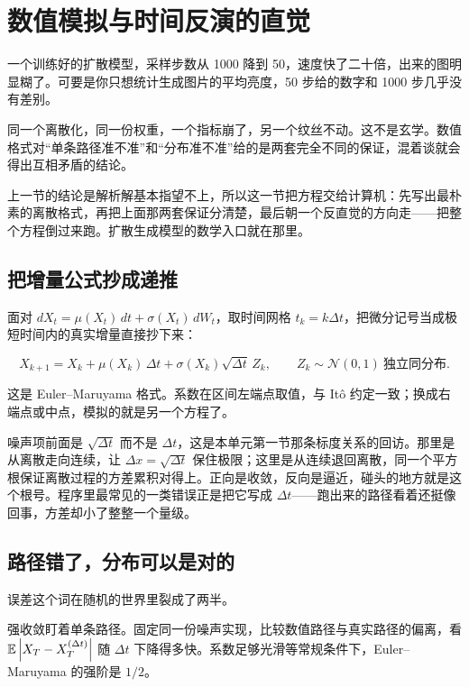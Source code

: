 \section{数值模拟与时间反演的直觉}
\label{sec:06-Random-Processes/06-Diffusion-and-SDE/04}

一个训练好的扩散模型，采样步数从 1000 降到 50，速度快了二十倍，出来的图明显糊了。可要是你只想统计生成图片的平均亮度，50 步给的数字和 1000 步几乎没有差别。

同一个离散化，同一份权重，一个指标崩了，另一个纹丝不动。这不是玄学。数值格式对``单条路径准不准''和``分布准不准''给的是两套完全不同的保证，混着谈就会得出互相矛盾的结论。

上一节的结论是解析解基本指望不上，所以这一节把方程交给计算机：先写出最朴素的离散格式，再把上面那两套保证分清楚，最后朝一个反直觉的方向走——把整个方程倒过来跑。扩散生成模型的数学入口就在那里。

\subsection{把增量公式抄成递推}

面对 \(dX_t=\mu(X_t)\,dt+\sigma(X_t)\,dW_t\)，取时间网格 \(t_k=k\Delta t\)，把微分记号当成极短时间内的真实增量直接抄下来：

\[
X_{k+1}=X_k+\mu(X_k)\,\Delta t+\sigma(X_k)\sqrt{\Delta t}\,Z_k,
\qquad Z_k\sim\mathcal N(0,1)\ \text{独立同分布}.
\]

这是 Euler--Maruyama 格式。系数在区间左端点取值，与 Itô 约定一致；换成右端点或中点，模拟的就是另一个方程了。

噪声项前面是 \(\sqrt{\Delta t}\) 而不是 \(\Delta t\)，这是本单元第一节那条标度关系的回访。那里是从离散走向连续，让 \(\Delta x=\sqrt{\Delta t}\) 保住极限；这里是从连续退回离散，同一个平方根保证离散过程的方差累积对得上。正向是收敛，反向是逼近，碰头的地方就是这个根号。程序里最常见的一类错误正是把它写成 \(\Delta t\)——跑出来的路径看着还挺像回事，方差却小了整整一个量级。

\subsection{路径错了，分布可以是对的}

误差这个词在随机的世界里裂成了两半。

强收敛盯着单条路径。固定同一份噪声实现，比较数值路径与真实路径的偏离，看 \(\mathbb{E}\left|X_T-X_T^{(\Delta t)}\right|\) 随 \(\Delta t\) 下降得多快。系数足够光滑等常规条件下，Euler--Maruyama 的强阶是 \(1/2\)。

